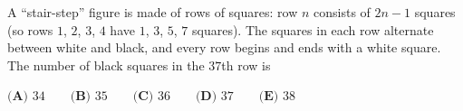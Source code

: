 A ``stair-step'' figure is made of rows of squares: row $n$ consists of $2n-1$ squares (so rows $1$, $2$, $3$, $4$ have $1$, $3$, $5$, $7$ squares). The squares in each row alternate between white and black, and every row begins and ends with a white square. The number of black squares in the $37$th row is

$\textbf{(A) }34\qquad\textbf{(B) }35\qquad\textbf{(C) }36\qquad\textbf{(D) }37\qquad\textbf{(E) }38$
